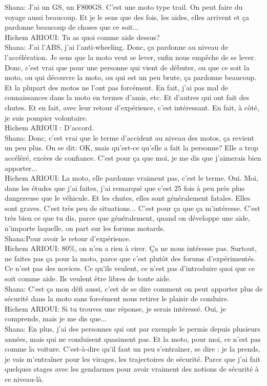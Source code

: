 Shana: J'ai un GS, un F800GS. C'est une moto type trail. On peut faire du voyage aussi beaucoup. Et je le sens que des fois, les aides, elles arrivent et ça pardonne beaucoup de choses que ce soit... \\
Hichem ARIOUI: Tu as quoi comme aide dessus? \\
Shana: J'ai l'ABS, j'ai l'anti-wheeling. Donc, ça pardonne au niveau de l'accélération. Je sens que la moto veut se lever, enfin nous empêche de se lever. Donc, c'est vrai que pour une personne qui vient de débuter, ou que ce soit la moto, ou qui découvre la moto, ou qui est un peu brute, ça pardonne beaucoup. Et la plupart des motos ne l'ont pas forcément. En fait, j'ai pas mal de connaissances dans la moto en termes d'amis, etc. Et d'autres qui ont fait des chutes. Et en fait, avec leur retour d'expérience, c'est intéressant. En fait, à côté, je suis pompier volontaire. \\
Hichem ARIOUI : D'accord. \\
Shana: Donc, c'est vrai que le terme d'accident au niveau des motos, ça revient un peu plus. On se dit: OK, mais qu'est-ce qu'elle a fait la personne? Elle a trop accéléré, excèes de confiance. C'est pour ça que moi, je me dis que j'aimerais bien apporter... \\
Hichem ARIOUI: La moto, elle pardonne vraiment pas, c'est le terme. Oui. Moi, dans les études que j'ai faites, j'ai remarqué que c'est 25 fois à peu près plus dangereuse que le véhicule. Et les chutes, elles sont généralement fatales. Elles sont graves. C'est très peu de situations... C'est pour ça que ça m'intéresse. C'est très bien ce que tu dis, parce que généralement, quand on développe une aide, n'importe laquelle, on part sur les forums motards. \\
Shana:Pour avoir le retour d'expérience. \\
Hichem ARIOUI: 80\%, on n'en a rien à cirer. Ça ne nous intéresse pas. Surtout, ne faites pas ça pour la moto, parce que c'est plutôt des forums d'expérimentés. Ce n'est pas des novices. Ce qu'ils veulent, ce n'est pas d'introduire quoi que ce soit comme aide. Ils veulent être libres de toute aide. \\
Shana: C'est ça mon défi aussi, c'est de se dire comment on peut apporter plus de sécurité dans la moto sans forcément nous retirer le plaisir de conduire. \\
Hichem ARIOUI: Si tu trouves une réponse, je serais intéressé. Oui, je comprends, mais je me dis que... \\
Shana: En plus, j'ai des personnes qui ont par exemple le permis depuis plusieurs années, mais qui ne conduisent quasiment pas. Et la moto, pour moi, ce n'est pas comme la voiture. C'est-à-dire qu'il faut un peu s'entraîner, se dire : je la prends, je vais m'entraîner pour les virages, les trajectoires de sécurité. Parce que j'ai fait quelques stages avec les gendarmes pour avoir vraiment des notions de sécurité à ce niveau-là. 
